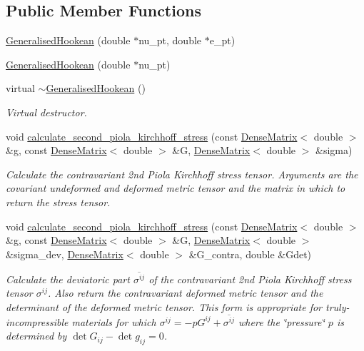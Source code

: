 \subsection*{Public Member Functions}
\begin{DoxyCompactItemize}
\item 
\hyperlink{classoomph_1_1GeneralisedHookean_ae345f3619a2826b4547f7cb42a052ca6}{Generalised\+Hookean} (double $\ast$nu\+\_\+pt, double $\ast$e\+\_\+pt)
\item 
\hyperlink{classoomph_1_1GeneralisedHookean_a470dde76fd6603da69bf4b6f12c50917}{Generalised\+Hookean} (double $\ast$nu\+\_\+pt)
\item 
virtual \hyperlink{classoomph_1_1GeneralisedHookean_a18794fa4b1750aafa2369b2a412a1228}{$\sim$\+Generalised\+Hookean} ()
\begin{DoxyCompactList}\small\item\em Virtual destructor. \end{DoxyCompactList}\item 
void \hyperlink{classoomph_1_1GeneralisedHookean_a5beca3e59f04d109c394bf9fd24bb7c1}{calculate\+\_\+second\+\_\+piola\+\_\+kirchhoff\+\_\+stress} (const \hyperlink{classoomph_1_1DenseMatrix}{Dense\+Matrix}$<$ double $>$ \&g, const \hyperlink{classoomph_1_1DenseMatrix}{Dense\+Matrix}$<$ double $>$ \&G, \hyperlink{classoomph_1_1DenseMatrix}{Dense\+Matrix}$<$ double $>$ \&sigma)
\begin{DoxyCompactList}\small\item\em Calculate the contravariant 2nd Piola Kirchhoff stress tensor. Arguments are the covariant undeformed and deformed metric tensor and the matrix in which to return the stress tensor. \end{DoxyCompactList}\item 
void \hyperlink{classoomph_1_1GeneralisedHookean_a641d0893e485df52b48b15e189a850ed}{calculate\+\_\+second\+\_\+piola\+\_\+kirchhoff\+\_\+stress} (const \hyperlink{classoomph_1_1DenseMatrix}{Dense\+Matrix}$<$ double $>$ \&g, const \hyperlink{classoomph_1_1DenseMatrix}{Dense\+Matrix}$<$ double $>$ \&G, \hyperlink{classoomph_1_1DenseMatrix}{Dense\+Matrix}$<$ double $>$ \&sigma\+\_\+dev, \hyperlink{classoomph_1_1DenseMatrix}{Dense\+Matrix}$<$ double $>$ \&G\+\_\+contra, double \&Gdet)
\begin{DoxyCompactList}\small\item\em Calculate the deviatoric part $ \overline{ \sigma^{ij}}$ of the contravariant 2nd Piola Kirchhoff stress tensor $ \sigma^{ij}$. Also return the contravariant deformed metric tensor and the determinant of the deformed metric tensor. This form is appropriate for truly-\/incompressible materials for which $ \sigma^{ij} = - p G^{ij} +\overline{ \sigma^{ij}} $ where the \char`\"{}pressure\char`\"{} $ p $ is determined by $ \det G_{ij} - \det g_{ij} = 0 $. \end{DoxyCompactList}\item 

\end{DoxyCompactItemize}
